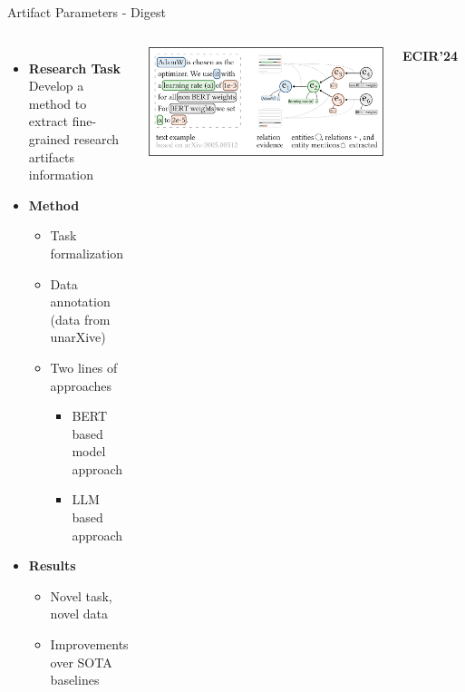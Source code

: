 \documentclass[en,16:9,smallfoot]{sdqbeamer}
\begin{document}
   \begin{frame}{Artifact Parameters - Digest}

   \begin{columns}
        \begin{itemize}
            \item \textbf{Research Task}\\Develop a method to extract fine-grained research artifacts information
            \item \textbf{Method}
            \begin{itemize}
                \item Task formalization
                \item Data annotation {\color{lightgrey}(data from unarXive)}
                \item Two lines of approaches
                \begin{itemize}
                    \item BERT based model approach
                    \item LLM based approach
                \end{itemize}
            \end{itemize}
            \item \textbf{Results}
            \begin{itemize}
                \item Novel task, novel data
                \item Improvements over SOTA baselines
            \end{itemize}
        \end{itemize}
            \includegraphics[width=\linewidth]{imgs/hyperpie_schema}
           \begin{infobox-pub-small}
           \textbf{ECIR'24}~\cite{Saier2024HyperPIE}
           \end{infobox-pub-small}
   \end{columns}
   \end{frame}
\end{document}

